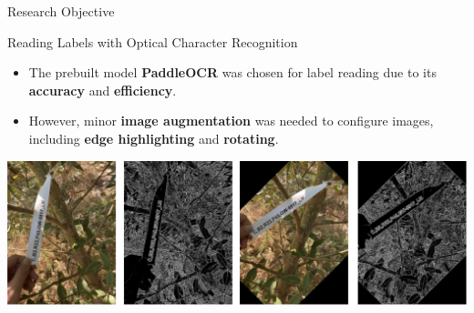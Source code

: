 \documentclass[final]{beamer}
\newlength{\colwidth}
\begin{document}
\begin{frame}[t]
\begin{columns}[t]
\begin{column}{\colwidth}
\begin{alertblock}{Research Objective}
\begin{enumerate}
\end{enumerate}


\end{alertblock}

\begin{block}{Reading Labels with Optical Character Recognition}


\begin{itemize}
    \item The prebuilt model \textbf{PaddleOCR} was chosen for label reading due to its \textbf{accuracy} and \textbf{efficiency}.
    \item However, minor \textbf{image augmentation} was needed to configure images, including \textbf{edge highlighting} and \textbf{rotating}.
\end{itemize}



\begin{center}
    \includegraphics[width=0.87\colwidth]{images/step1_pipeline.png}
\end{center}

\vspace{-0.5\intextsep}



\end{block}
\end{column}
\end{columns}
\end{frame}
\end{document}
